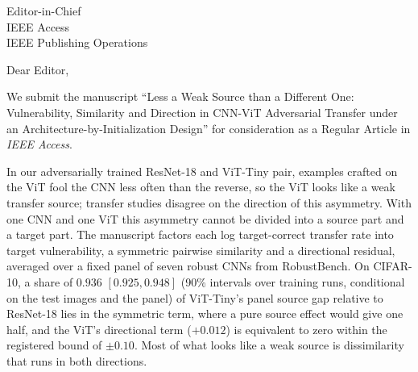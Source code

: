 \documentclass[11pt]{letter}
\begin{document}
\begin{letter}{
Editor-in-Chief\\
IEEE Access\\
IEEE Publishing Operations
}

\opening{Dear Editor,}

We submit the manuscript ``Less a Weak Source than a Different One: Vulnerability, Similarity and Direction in CNN-ViT Adversarial Transfer under an Architecture-by-Initialization Design'' for consideration as a Regular Article in \textit{IEEE Access}.

In our adversarially trained ResNet-18 and ViT-Tiny pair, examples crafted on the ViT fool the CNN less often than the reverse, so the ViT looks like a weak transfer source; transfer studies disagree on the direction of this asymmetry. With one CNN and one ViT this asymmetry cannot be divided into a source part and a target part. The manuscript factors each log target-correct transfer rate into target vulnerability, a symmetric pairwise similarity and a directional residual, averaged over a fixed panel of seven robust CNNs from RobustBench. On CIFAR-10, a share of $0.936$ $[0.925, 0.948]$ (90\% intervals over training runs, conditional on the test images and the panel) of ViT-Tiny's panel source gap relative to ResNet-18 lies in the symmetric term, where a pure source effect would give one half, and the ViT's directional term ($+0.012$) is equivalent to zero within the registered bound of $\pm0.10$. Most of what looks like a weak source is dissimilarity that runs in both directions.


\end{letter}
\end{document}
